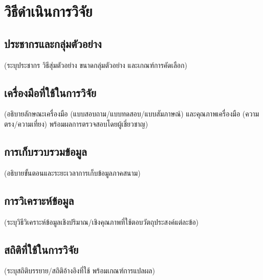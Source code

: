\chapter{วิธีดำเนินการวิจัย}

\section{ประชากรและกลุ่มตัวอย่าง}
(ระบุประชากร วิธีสุ่มตัวอย่าง ขนาดกลุ่มตัวอย่าง และเกณฑ์การคัดเลือก)

\section{เครื่องมือที่ใช้ในการวิจัย}
(อธิบายลักษณะเครื่องมือ (แบบสอบถาม/แบบทดสอบ/แบบสัมภาษณ์) และคุณภาพเครื่องมือ
(ความตรง/ความเที่ยง) พร้อมผลการตรวจสอบโดยผู้เชี่ยวชาญ)

\section{การเก็บรวบรวมข้อมูล}
(อธิบายขั้นตอนและระยะเวลาการเก็บข้อมูลภาคสนาม)

\section{การวิเคราะห์ข้อมูล}
(ระบุวิธีวิเคราะห์ข้อมูลเชิงปริมาณ/เชิงคุณภาพที่ใช้ตอบวัตถุประสงค์แต่ละข้อ)

\section{สถิติที่ใช้ในการวิจัย}
(ระบุสถิติบรรยาย/สถิติอ้างอิงที่ใช้ พร้อมเกณฑ์การแปลผล)
